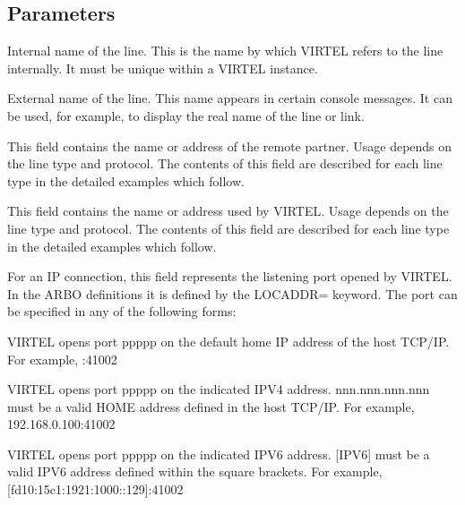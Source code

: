 \documentclass[letterpaper,10pt,english]{sphinxmanual}
\begin{document}
\ignorespaces 

\subsection{Parameters}
\label{\detokenize{connectivity_guide:parameters}}\label{\detokenize{connectivity_guide:index-8}}\begin{description}
\sphinxAtStartPar
Internal name of the line. This is the name by which VIRTEL refers to the line internally. It must be unique within a VIRTEL instance.

\sphinxAtStartPar
External name of the line. This name appears in certain console messages. It can be used, for example, to display the real name of the line or link.

\sphinxAtStartPar
This field contains the name or address of the remote partner. Usage
depends on the line type and protocol. The contents of this field
are described for each line type in the detailed examples which
follow.

\sphinxAtStartPar
This field contains the name or address used by VIRTEL. Usage depends on the line type and protocol. The contents of this field are described for each line type in the detailed examples which
follow.

\sphinxAtStartPar
For an IP connection, this field represents the listening port opened by VIRTEL. In the ARBO definitions it is defined by the LOCADDR= keyword. The port can be specified in any of the following forms:
\begin{description}
\sphinxAtStartPar
VIRTEL opens port ppppp on the default home IP address of the host
TCP/IP. For example, :41002

\sphinxAtStartPar
VIRTEL opens port ppppp on the indicated IPV4 address. nnn.nnn.nnn.nnn
must be a valid HOME address defined in the host TCP/IP. For
example, 192.168.0.100:41002

\sphinxAtStartPar
VIRTEL opens port ppppp on the indicated IPV6 address. {[}IPV6{]}
must be a valid IPV6 address defined within the square brackets. For
example, {[}fd10:15c1:1921:1000::129{]}:41002


\end{description}
\end{description}
\end{document}
